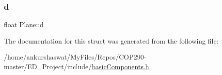 \subsubsection{\texorpdfstring{d}{d}}
{\footnotesize\ttfamily float Plane\+::d}



The documentation for this struct was generated from the following file\+:\begin{DoxyCompactItemize}
\item 
/home/ankurshaswat/\+My\+Files/\+Repos/\+C\+O\+P290-\/master/\+E\+D\+\_\+\+Project/include/\hyperlink{basicComponents_8h}{basic\+Components.\+h}\end{DoxyCompactItemize}
